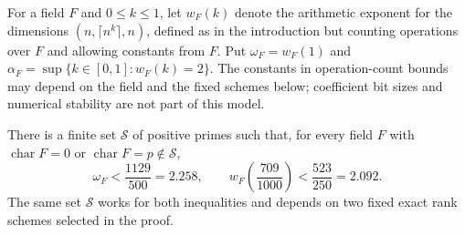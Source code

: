For a field \(F\) and \(0\le k\le1\), let \(w_F(k)\) denote the arithmetic exponent for
the dimensions \((n,\lceil n^k\rceil,n)\), defined as in the
introduction but counting operations over \(F\) and allowing constants
from \(F\).  Put \(\omega_F=w_F(1)\) and
\(\alpha_F=\sup\{k\in[0,1]:w_F(k)=2\}\).  The constants in operation-count
bounds may depend on the field and the fixed schemes below; coefficient
bit sizes and numerical stability are not part of this model.

\begin{corollary}\label{cor:characteristic-transfer}
There is a finite set \(\mathcal S\) of positive primes such that, for
every field \(F\) with \(\operatorname{char}F=0\) or
\(\operatorname{char}F=p\notin\mathcal S\),
\[
 \omega_F<\frac{1129}{500}=2.258,\qquad
 w_F\!\left(\frac{709}{1000}\right)<\frac{523}{250}=2.092.
\]
The same set \(\mathcal S\) works for both inequalities and depends on
two fixed exact rank schemes selected in the proof.
\end{corollary}

